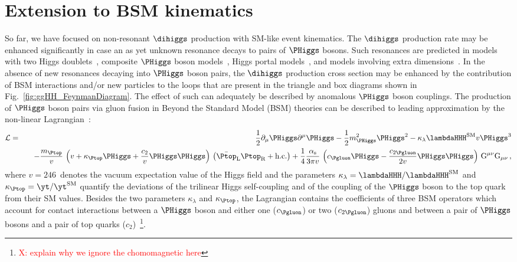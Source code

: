 \section{Extension to BSM  kinematics}

So far, we have focused on non-resonant $\dihiggs$ production with SM-like event kinematics. 
The $\dihiggs$ production rate may be enhanced significantly in case an as yet unknown resonance decays to pairs of $\PHiggs$ bosons.
Such resonances are predicted in models with two Higgs doublets~\cite{Branco:2011iw}, composite $\PHiggs$ boson models~\cite{Grober:2010yv}, 
Higgs portal models~\cite{Patt:2006fw}, and models involving extra dimensions~\cite{Randall:1999ee}. 
In the absence of new resonances decaying into $\PHiggs$ boson pairs,
the $\dihiggs$ production cross section may be enhanced by the contribution of BSM interactions and/or new particles to the loops 
that are present in the triangle and box diagrams shown in Fig.~\ref{fig:ggHH_FeynmanDiagram}. 
The effect of such  can adequately be described by anomalous $\PHiggs$ boson couplings. 
The production of $\PHiggs$ boson pairs via gluon fusion in Beyond the Standard Model (BSM) theories can be described to leading approximation by the non-linear  Lagrangian~\cite{Buchmuller:1985jz}:
\begin{eqnarray}
\mathcal{L} & = & \frac{1}{2} \partial_{\mu}\PHiggs\partial^{\mu}\PHiggs - \frac{1}{2} m_{\PHiggs}^{2} \PHiggs^{2} - \kappa_{\lambda} \lambdaHHH^{\textrm{SM}} v \PHiggs^{3} \nonumber \\
 & & \quad -\frac{m_{\Ptop}}{v} \, \left( v + \kappa_{\Ptop} \PHiggs + \frac{c_{2}}{v} \PHiggs\PHiggs \right) \, \left( \bar{\Ptop}_{\textrm{L}} \Ptop_{\textrm{R}} + \textrm{h.c.} \right) 
+ \frac{1}{4} \frac{\alpha_{\textrm{s}}}{3 \pi v} \, \left( c_{\Pgluon} \PHiggs - \frac{c_{2\Pgluon}}{2 v} \PHiggs\PHiggs \right) \, \textrm{G}^{\mu\nu}\textrm{G}_{\mu\nu} \, ,
\end{eqnarray}
where $v = 246$~\GeV denotes the vacuum expectation value of the Higgs field
and the parameters $\kappa_{\lambda} = \lambdaHHH/\lambdaHHH^{\textrm{SM}}$ and $\kappa_{\Ptop} = \yt/\yt^{\textrm{SM}}$ 
quantify the deviations of the trilinear Higgs self-coupling and of the coupling of the $\PHiggs$ boson to the top quark from their SM values.
Besides the two parameters $\kappa_{\lambda}$ and $\kappa_{\Ptop}$,
the Lagrangian contains the coefficients of three BSM operators which account for contact interactions 
between a $\PHiggs$ boson and either one ($c_{\Pgluon}$) or two ($c_{2\Pgluon}$) gluons
and between a pair of $\PHiggs$ bosons and a pair of top quarks ($c_{2}$)~\footnote{ \textcolor{red}{X: explain why we ignore the chomomagnetic here}}.


